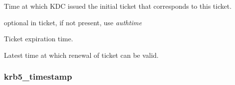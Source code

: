 \documentclass[letterpaper,10pt,english]{sphinxmanual}
\begin{document}
\begin{fulllineitems}
\label{appdev/refs/types/krb5_ticket_times:c.krb5_ticket_times.authtime}
Time at which KDC issued the initial ticket that corresponds to this ticket.

\end{fulllineitems}


\begin{fulllineitems}
\label{appdev/refs/types/krb5_ticket_times:c.krb5_ticket_times.starttime}
optional in ticket, if not present, use \emph{authtime}

\end{fulllineitems}


\begin{fulllineitems}
\label{appdev/refs/types/krb5_ticket_times:c.krb5_ticket_times.endtime}
Ticket expiration time.

\end{fulllineitems}


\begin{fulllineitems}
\label{appdev/refs/types/krb5_ticket_times:c.krb5_ticket_times.renew_till}
Latest time at which renewal of ticket can be valid.

\end{fulllineitems}



\subsubsection{krb5\_timestamp}
\label{appdev/refs/types/krb5_timestamp:krb5-timestamp-struct}\label{appdev/refs/types/krb5_timestamp::doc}\label{appdev/refs/types/krb5_timestamp:krb5-timestamp}
\end{document}
